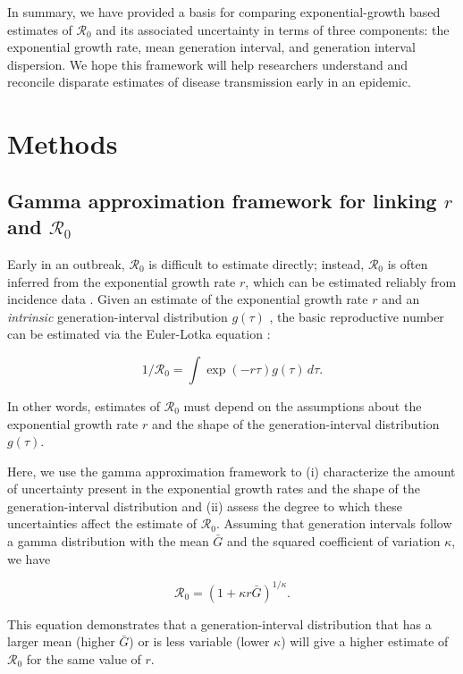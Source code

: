 \documentclass[12pt]{article}
\newcommand{\Ro}{\ensuremath{{\mathcal R}_{0}}\xspace}
\begin{document}
In summary, we have provided a basis for comparing exponential-growth based estimates of \Ro and its associated uncertainty in terms of three components: the exponential growth rate, mean generation interval, and generation interval dispersion. 
We hope this framework will help researchers understand and reconcile disparate estimates of disease transmission early in an epidemic.

\section{Methods}

\subsection{Gamma approximation framework for linking $r$ and $\Ro$}

Early in an outbreak, \Ro is difficult to estimate directly;
instead, \Ro is often inferred from the exponential growth rate $r$, which can be estimated reliably from incidence data \citep{ma2014estimating}.
Given an estimate of the exponential growth rate $r$ and an \emph{intrinsic} generation-interval distribution $g(\tau)$ \citep{champredon2015intrinsic}, the basic reproductive
number can be estimated via the Euler-Lotka equation \citep{wallinga2007generation}:
\begin{linenomath*}
\begin{equation}
1/\Ro = \int \exp(-r\tau) g(\tau) \, d\tau.
\label{eq:euler}
\end{equation}
\end{linenomath*}
In other words, estimates of \Ro must
depend on the assumptions about the
exponential growth rate $r$ and the shape of the generation-interval distribution $g(\tau)$.

Here, we use the gamma approximation framework \citep{mcbryde2009early, nishiura2009transmission, roberts2011early, park2019practical} to (i) characterize the amount of uncertainty present in the exponential growth rates and the shape of the generation-interval distribution and (ii) assess the degree to which these uncertainties affect the estimate of \Ro.
Assuming that generation intervals follow a gamma distribution
with the mean $\bar G$ and the squared coefficient of variation $\kappa$, 
we have
\begin{linenomath*}
\begin{equation}
\Ro = \left(1 + \kappa r \bar{G}\right)^{1/\kappa}.
\label{eq:gamma}
\end{equation}
\end{linenomath*}
This equation demonstrates that a generation-interval distribution
that has a larger mean (higher $\bar{G}$) or is less variable (lower $\kappa$)
will give a higher estimate of \Ro for the same value of $r$.
\end{document}
